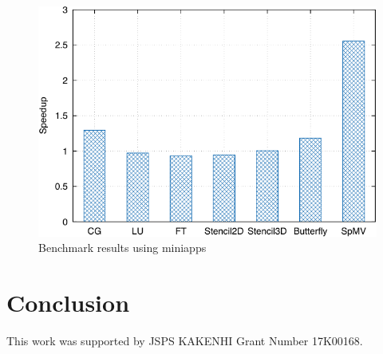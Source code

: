 \documentclass[graybox]{svmult}
\begin{document}
\begin{figure}
    \centering
    \includegraphics{benchmark_result}
    \caption{Benchmark results using miniapps}%
    \label{kt:fig:benchmark}
\end{figure}

\section{Conclusion}\label{kt:sec:v}

\begin{acknowledgement}
This work was supported by JSPS KAKENHI Grant Number 17K00168.
\end{acknowledgement}



\end{document}
